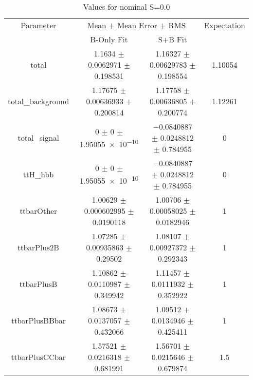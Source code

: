 \begin{table}
\centering
\caption{Values for nominal S=0.0}
\begin{tabular}{cccc}
\toprule
Parameter & \multicolumn{2}{c}{Mean $\pm$ Mean Error $\pm$ RMS} & Expectation\\
 & B-Only Fit & S+B Fit & \\
\midrule
total & \num{1.1634} $\pm$ \num{0.0062971} $\pm$ \num{0.198531} & \num{1.16327} $\pm$ \num{0.00629783} $\pm$ \num{0.198554} & \num{1.10054}\\
total\_background & \num{1.17675} $\pm$ \num{0.00636933} $\pm$ \num{0.200814} & \num{1.17758} $\pm$ \num{0.00636805} $\pm$ \num{0.200774} & \num{1.12261}\\
total\_signal & \num{0} $\pm$ \num{0} $\pm$ \num{1.95055e-10} & \num{-0.0840887} $\pm$ \num{0.0248812} $\pm$ \num{0.784955} & \num{0}\\
ttH\_hbb & \num{0} $\pm$ \num{0} $\pm$ \num{1.95055e-10} & \num{-0.0840887} $\pm$ \num{0.0248812} $\pm$ \num{0.784955} & \num{0}\\
ttbarOther & \num{1.00629} $\pm$ \num{0.000602995} $\pm$ \num{0.0190118} & \num{1.00706} $\pm$ \num{0.00058025} $\pm$ \num{0.0182946} & \num{1}\\
ttbarPlus2B & \num{1.07285} $\pm$ \num{0.00935863} $\pm$ \num{0.29502} & \num{1.08107} $\pm$ \num{0.00927372} $\pm$ \num{0.292343} & \num{1}\\
ttbarPlusB & \num{1.10862} $\pm$ \num{0.0110987} $\pm$ \num{0.349942} & \num{1.11457} $\pm$ \num{0.0111932} $\pm$ \num{0.352922} & \num{1}\\
ttbarPlusBBbar & \num{1.08673} $\pm$ \num{0.0137057} $\pm$ \num{0.432066} & \num{1.09512} $\pm$ \num{0.0134946} $\pm$ \num{0.425411} & \num{1}\\
ttbarPlusCCbar & \num{1.57521} $\pm$ \num{0.0216318} $\pm$ \num{0.681991} & \num{1.56701} $\pm$ \num{0.0215646} $\pm$ \num{0.679874} & \num{1.5}\\
\bottomrule
\end{tabular}
\end{table}